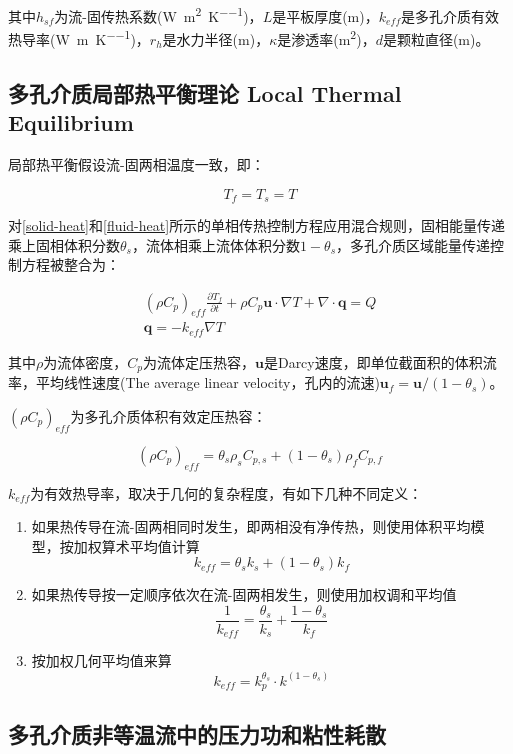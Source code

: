 其中$ h_{sf} $为流-固传热系数(\si{\watt\per\meter\squared\per\kelvin})，$ L $是平板厚度(\si{\meter})，$ k_{eff} $是多孔介质有效热导率(\si{\watt\per\meter\per\kelvin})，$ r_h $是水力半径(\si{\meter})，$ \kappa $是渗透率(\si{\square\meter})，$ d $是颗粒直径(\si{\meter})。

\subsection{多孔介质局部热平衡理论 Local Thermal Equilibrium}
局部热平衡假设流-固两相温度一致，即：

\[T_f=T_s=T\]

对\autoref{solid-heat}和\autoref{fluid-heat}所示的单相传热控制方程应用混合规则，固相能量传递乘上固相体积分数$ \theta_s $，流体相乘上流体体积分数$ 1-\theta_s $，多孔介质区域能量传递控制方程被整合为：

\begin{gather}
(\rho C_p)_{eff} \frac{\partial T_f}{\partial t} + \rho C_p\bm{u}\cdot\nabla T + \nabla\cdot\bm{q} = Q \\
\bm{q} = -k_{eff}\nabla T
\end{gather}

其中$ \rho $为流体密度，$ C_p $为流体定压热容，$ \bm{u} $是Darcy速度，即单位截面积的体积流率，平均线性速度(The average linear velocity，孔内的流速)$ \bm{u}_f=\bm{u}/(1-\theta_s) $。

$ (\rho C_p)_{eff} $为多孔介质体积有效定压热容：

\[(\rho C_p)_{eff} = \theta_s\rho_sC_{p,s} + (1-\theta_s)\rho_f C_{p,f}\]

$ k_{eff} $为有效热导率，取决于几何的复杂程度，有如下几种不同定义：

\begin{enumerate}
    \item 如果热传导在流-固两相同时发生，即两相没有净传热，则使用体积平均模型，按加权算术平均值计算
    \[k_{eff} =\theta_s k_s + (1-\theta_s)k_f\]
    \item 如果热传导按一定顺序依次在流-固两相发生，则使用加权调和平均值
    \[\frac{1}{k_{eff}} = \frac{\theta_s}{k_s} + \frac{1-\theta_s}{k_f} \]
    \item 按加权几何平均值来算
    \[k_{eff} = k_p^{\theta_s}\cdot k^(1-\theta_s) \]
\end{enumerate}

\subsection{多孔介质非等温流中的压力功和粘性耗散}


